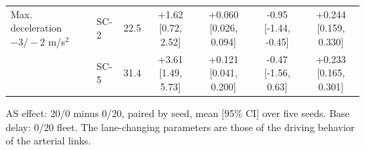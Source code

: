 \begin{table}[htbp]
{\begin{tabular}{llccccc}
    Max. deceleration $-3/-2$ m/s$^2$ & SC-2 & 22.5 & +1.62 [0.72, 2.52] & +0.060 [0.026, 0.094] & -0.95 [-1.44, -0.45] & +0.244 [0.159, 0.330] \\
     & SC-5 & 31.4 & +3.61 [1.49, 5.73] & +0.121 [0.041, 0.200] & -0.47 [-1.56, 0.63] & +0.233 [0.165, 0.301] \\
    \bottomrule
    \end{tabular}}
  \par\vspace{3pt}\parbox{\textwidth}{\footnotesize AS effect: 20/0 minus 0/20, paired by seed, mean [95\% CI] over five seeds. Base delay: 0/20 fleet. The lane-changing parameters are those of the driving behavior of the arterial links.}
  \label{tab:sens_turns_lc}
\end{table}
